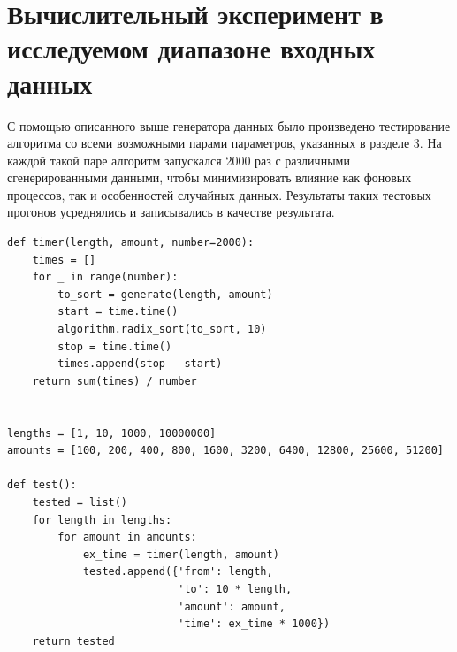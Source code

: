 \documentclass[a4paper]{article}
\begin{document}
\section{Вычислительный эксперимент в исследуемом диапазоне входных данных}
С помощью описанного выше генератора данных было произведено тестирование алгоритма со всеми возможными парами параметров, указанных в разделе 3. На каждой такой паре алгоритм запускался 2000 раз с различными сгенерированными данными, чтобы минимизировать влияние как фоновых процессов, так и особенностей случайных данных. Результаты таких тестовых прогонов усреднялись и записывались в качестве результата.
\begin{lstlisting}
def timer(length, amount, number=2000):
    times = []
    for _ in range(number):
        to_sort = generate(length, amount)
        start = time.time()
        algorithm.radix_sort(to_sort, 10)
        stop = time.time()
        times.append(stop - start)
    return sum(times) / number
    

lengths = [1, 10, 1000, 10000000]
amounts = [100, 200, 400, 800, 1600, 3200, 6400, 12800, 25600, 51200]

def test():
    tested = list()
    for length in lengths:
        for amount in amounts:
            ex_time = timer(length, amount)
            tested.append({'from': length,
                           'to': 10 * length,
                           'amount': amount,
                           'time': ex_time * 1000})
    return tested
\end{lstlisting}
\end{document}
